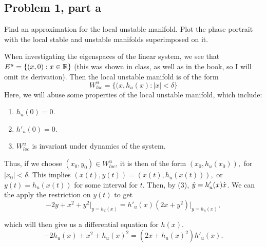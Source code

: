 \subsection{Problem 1, part a}
Find an approximation for the local unstable manifold. Plot the phase portrait with the local stable and unstable manifolds superimposed on it. 
\partbreak
\begin{solution}
    When investigating the eigenspaces of the linear system, we see that $E^u = \{(x, 0):x \in \mathbb{R}\}$ (this was shown in class, as well as in the book, so I will omit its derivation). Then the local unstable manifold is of the form
    \[
    W^u_{loc} = \{(x, h_u(x) : |x| < \delta\}
    \]
    Here, we will abuse some properties of the local unstable manifold, which include:
    \begin{enumerate}
        \item $h_u(0) = 0.$
        \item $h'_u(0) = 0.$
        \item $W_{loc}^u$ is invariant under dynamics of the system.
    \end{enumerate}

    Thus, if we choose $(x_0, y_0) \in W^u_{loc}$, it is then of the form $(x_0, h_u(x_0)), $ for $|x_0| < \delta$. This implies $(x(t), y(t)) = (x(t), h_u(x(t))),$ or $y(t) = h_u(x(t))$ for some interval for $t$. Then, by (3), $\dot{y} = h'_u(x)\dot{x}$. We can the apply the restriction on $y(t)$ to get
    \[
    -2y + x^2 + y^2 \Bigg|_{y = h_x(x)} = h'_u(x)(2x + y^2)\Bigg|_{y = h_u(x)},
    \]

    which will then give us a differential equation for $h(x)$.
    \[
    -2h_u(x) + x^2 + h_u(x)^2 = (2x + h_u(x)^2)h'_u(x).
    \]


\end{solution}
